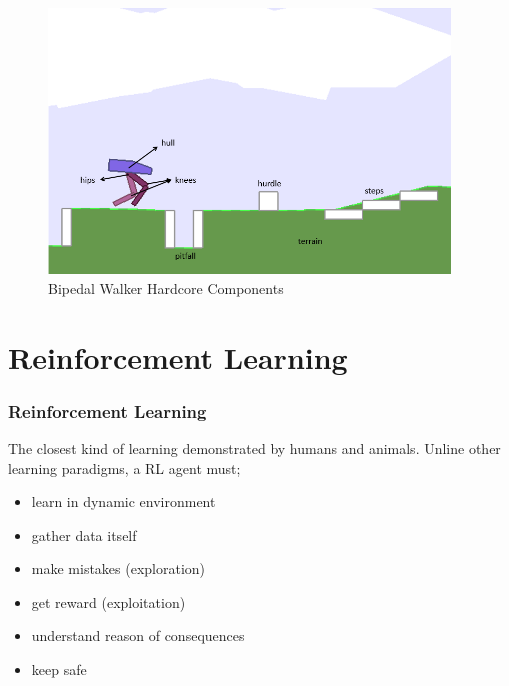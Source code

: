 \documentclass{beamer}
\begin{document}
\begin{frame}
\begin{figure}
\centering
\includegraphics[width=0.95\textwidth]{figures/bipedal/bpedal_annotated.png}
\caption{Bipedal Walker Hardcore Components~\cite{noauthor_bipedalwalkerhardcore-v2_2021}}
\label{fig:bipedal_hardcore_components}
\end{figure}
\end{frame}


\section{Reinforcement Learning}

\begin{frame}
\frametitle{Reinforcement Learning}
The closest kind of learning demonstrated by humans and animals. 
Unline other learning paradigms, a RL agent must;
\begin{itemize}
	\item learn in dynamic environment
	\item gather data itself
	\item make mistakes (exploration)
	\item get reward (exploitation)
	\item understand reason of consequences
	\item keep safe
\end{itemize}
\end{frame}
\end{document}
